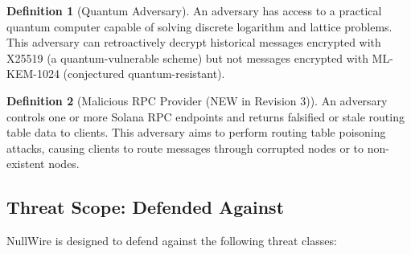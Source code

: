 \documentclass[11pt]{article}
\theoremstyle{definition}
\newtheorem{definition}{Definition}
\theoremstyle{remark}
\begin{document}
\begin{definition}[Quantum Adversary]
An adversary has access to a practical quantum computer capable of solving discrete logarithm and lattice problems. This adversary can retroactively decrypt historical messages encrypted with X25519 (a quantum-vulnerable scheme) but not messages encrypted with ML-KEM-1024 (conjectured quantum-resistant).
\end{definition}

\begin{definition}[Malicious RPC Provider (NEW in Revision 3)]
An adversary controls one or more Solana RPC endpoints and returns falsified or stale routing table data to clients. This adversary aims to perform routing table poisoning attacks, causing clients to route messages through corrupted nodes or to non-existent nodes.
\end{definition}

\subsection{Threat Scope: Defended Against}

NullWire is designed to defend against the following threat classes:
\end{document}

